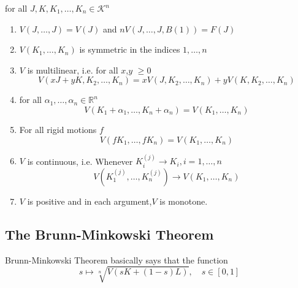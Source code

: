 \documentclass[oneside]{book}
\theoremstyle{definition}
\begin{document}
 for all $J, K, K_{1}, \ldots, K_{n} 
  \in \mathcal{K}^{n}$ \\ 
  \begin{enumerate}
      
  \item
$V(J, \ldots, J)=V(J)$ and $ nV(J, \ldots, J, B(1))=F(J)$ 

\item 
$V\left(K_{1}, \ldots, K_{n}\right)$ is symmetric in the indices $1,\ldots, n$
\item
 $V$ is multilinear, i.e.
 for all $ x$,$y$ $\geq 0 $
$$
V\left(x J+y K, K_{2}, \ldots, K_{n}\right)=x V\left(J, K_{2}, \ldots, K_{n}\right)+y V\left(K, K_{2}, \ldots, K_{n}\right)
$$
\item
for all $\alpha_{1}, \ldots, \alpha_{n} \in \mathbb{R}^{n}$
$$
V\left(K_{1}+\alpha_{1}, \ldots, K_{n}+\alpha_{n}\right)=V\left(K_{1}, \ldots, K_{n}\right)
$$
\item  
For all rigid motions $f$ 
$$ 
V\left(f K_{1}, \ldots, f K_{n}\right)=V\left(K_{1}, \ldots, K_{n}\right)
$$ 

\item
$V$ is continuous, i.e.
Whenever $K_{i}^{(j)} \rightarrow K_{i}, i=1, \ldots, n$
\[
V\left(K_{1}^{(j)}, \ldots, K_{n}^{(j)}\right) \rightarrow V\left(K_{1}, \ldots, K_{n}\right)
\]

\item $V$ is positive and in each argument,$V$ is monotone.
 
 
  \end{enumerate}
 
 
 
 
 \subsection{The Brunn-Minkowski Theorem}
 
 Brunn-Minkowski Theorem  basically says that the function 
 \[s  \mapsto \sqrt[n]{V(s K+(1- s) L)}, \quad s \in[0,1]
\]
\end{document}
